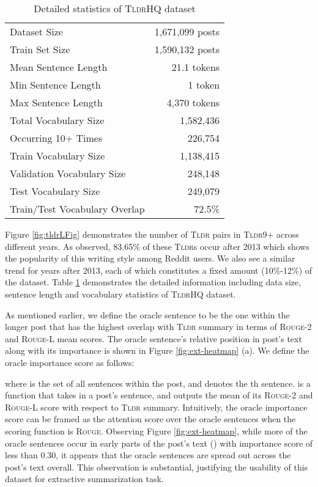 \documentclass[11pt]{article}
\newcommand{\tldrl}{\textsc{Tldr9+}}
\newcommand{\tldrs}{\textsc{TldrHQ}}
\newcommand{\tldr}{\textsc{Tldr}}
\begin{document}
\begin{table}[t]
    \centering
\begin{tabular}{lr}
    \toprule
     Dataset Size & 1,671,099 posts \\
     Train Set Size & 1,590,132 posts \\
     \midrule
     Mean Sentence Length & 21.1 tokens\\
     Min Sentence Length & 1 token \\
     Max Sentence Length & 4,370 tokens \\
     \midrule
     Total Vocabulary Size & 1,582,436 \\
     Occurring 10+ Times & 226,754 \\
     Train Vocabulary Size & 1,138,415 \\
     Validation Vocabulary Size & 248,148 \\
     Test Vocabulary Size & 249,079 \\
     
     Train/Test Vocabulary Overlap & 72.5\% \\
     \bottomrule
    \end{tabular}
\caption{Detailed statistics of \tldrs{} dataset}
    \label{tab:tldrQ_stat}
\end{table}

Figure \ref{fig:tldrLFig} demonstrates the number of \tldr{} pairs in \tldrl{} across different years. As observed, 83.65\% of these \tldr s occur after 2013 which shows the popularity of this writing style among Reddit users.  We also see a similar trend for years after 2013, each of which constitutes a fixed amount (10\%-12\%) of the dataset. Table \ref{tab:tldrQ_stat} demonstrates the detailed information including data size, sentence length and vocabulary statistics of \tldrs{} dataset. 

As mentioned earlier, we define the oracle sentence to be the one within the longer post that has the highest overlap with \tldr{} summary in terms of \textsc{Rouge-2} and \textsc{Rouge-L} mean scores.  The oracle sentence's relative position in post's text along with its importance is shown in Figure \ref{fig:ext-heatmap} (a). We define the oracle importance score as follows: 

where  is the set of all sentences within the post, and   denotes the th sentence.  is a function that takes in a post's sentence, and outputs the mean of its \textsc{Rouge-2} and \textsc{Rouge-L} score with respect to \tldr{} summary. Intuitively, the oracle importance score can be framed as the attention score over the oracle sentences when the scoring function is \textsc{Rouge}. Observing Figure \ref{fig:ext-heatmap}, while more of the oracle sentences occur in early parts of the post's text () with importance score of less than 0.30, it appears that the oracle sentences are spread out across the post's text overall. This observation is substantial, justifying the usability of this dataset for extractive summarization task.
\end{document}
